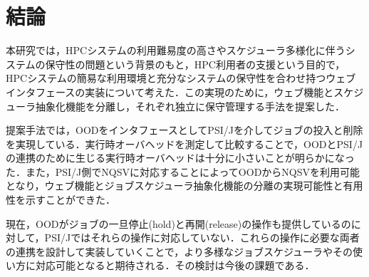 \documentclass[a4paper,oneside,twocolumn,notitlepage,dvipdfmx]{jsarticle}
\begin{document}
\vspace{3\baselineskip}
\section{結論}
本研究では，HPCシステムの利用難易度の高さやスケジューラ多様化に伴うシステムの保守性の問題という背景のもと，HPC利用者の支援という目的で，HPCシステムの簡易な利用環境と充分なシステムの保守性を合わせ持つウェブインタフェースの実装について考えた．この実現のために，ウェブ機能とスケジューラ抽象化機能を分離し，それぞれ独立に保守管理する手法を提案した．\par
提案手法では，OODをインタフェースとしてPSI/Jを介してジョブの投入と削除を実現している．実行時オーバヘッドを測定して比較することで，OODとPSI/Jの連携のために生じる実行時オーバヘッドは十分に小さいことが明らかになった．また，PSI/J側でNQSVに対応することによってOODからNQSVを利用可能となり，ウェブ機能とジョブスケジューラ抽象化機能の分離の実現可能性と有用性を示すことができた．\par
現在，OODがジョブの一旦停止(hold)と再開(release)の操作も提供しているのに対して，PSI/Jではそれらの操作に対応していない．これらの操作に必要な両者の連携を設計して実装していくことで，より多様なジョブスケジューラやその使い方に対応可能となると期待される．その検討は今後の課題である．\par

\vspace{3\baselineskip}


\end{document}
